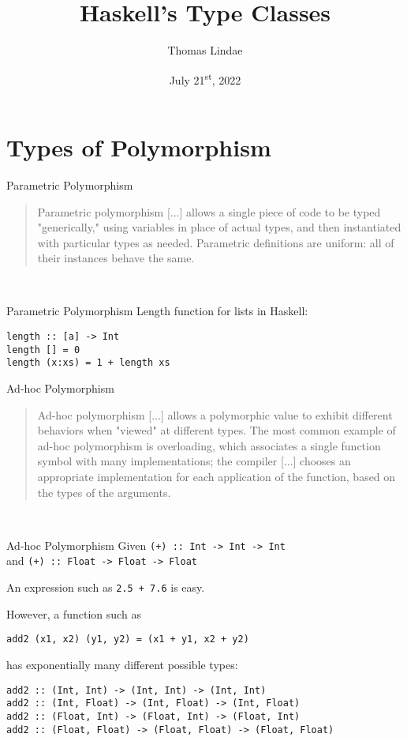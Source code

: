 \documentclass[
  english,            %
  aspectratio=169,    %
]{tumbeamer}
\title[Type Classes]{Haskell's Type Classes}
\subtitle{}
\author{Thomas Lindae}
\institute{\theChairName\\\theDepartmentName\\\theUniversityName}
\date[2022-07-21]{July 21\textsuperscript{st}, 2022}
\begin{document}
\maketitle

\section{Types of Polymorphism}

\begin{frame}[fragile]{Parametric Polymorphism}
\begin{quote}Parametric polymorphism [...] allows a single piece of code to be typed "generically," using variables in place of actual types, and then instantiated with particular types as needed. Parametric definitions are uniform: all of their instances behave the same.
\end{quote}~
\end{frame}

\begin{frame}[fragile]{Parametric Polymorphism}
Length function for lists in Haskell:
\begin{verbatim}
length :: [a] -> Int
length [] = 0
length (x:xs) = 1 + length xs
\end{verbatim}
\end{frame}

\begin{frame}[fragile]{Ad-hoc Polymorphism}
\begin{quote}
Ad-hoc polymorphism [...] allows a polymorphic value to exhibit different behaviors when "viewed" at different types. The most common example of ad-hoc polymorphism is overloading, which associates a single function symbol with many implementations; the compiler [...] chooses an appropriate implementation for each application of the function, based on the types of the arguments.
\end{quote}~
\end{frame}

\begin{frame}[fragile]{Ad-hoc Polymorphism}
Given \texttt{(+) :: Int -> Int -> Int} \\
and \texttt{(+) :: Float -> Float -> Float} \pause \vspace{3mm}

An expression such as \texttt{2.5 + 7.6} is easy. \pause \vspace{3mm}

However, a function such as
\begin{verbatim}
add2 (x1, x2) (y1, y2) = (x1 + y1, x2 + y2)
\end{verbatim}
\pause \vspace{3mm} has exponentially many different possible types:
\begin{verbatim}
add2 :: (Int, Int) -> (Int, Int) -> (Int, Int)
add2 :: (Int, Float) -> (Int, Float) -> (Int, Float)
add2 :: (Float, Int) -> (Float, Int) -> (Float, Int)
add2 :: (Float, Float) -> (Float, Float) -> (Float, Float)
\end{verbatim}
\end{frame}
\end{document}
